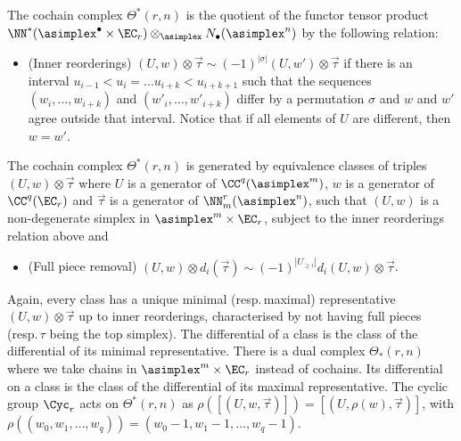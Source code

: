 \begin{definition} The cochain complex $\Theta^*(r,n)$ is the quotient of the functor tensor product $\NN^*(\asimplex^\bullet\times \EC_r)\otimes_{\asimplex}
N_\bullet(\asimplex^n)$
by the following relation:
\begin{itemize}
    	\item (Inner reorderings) $(U,w)\otimes \vec{\tau}\sim (-1)^{|\sigma|}(U,w')\otimes \vec{\tau}$ if there is an interval $u_{i-1}<u_i =\ldots u_{i+k}<u_{i+k+1}$ such that the sequences $(w_i,\ldots,w_{i+k})$ and $(w'_i,\ldots,w'_{i+k})$ differ by a permutation $\sigma$ and $w$ and $w'$ agree outside that interval. Notice that if all elements of $U$ are different, then $w=w'$.
\end{itemize}
\end{definition}
 The cochain complex $\Theta^*(r,n)$ is generated by equivalence classes of triples $(U,w)\otimes \vec{\tau}$ where $U$ is a generator of $\CC^q(\asimplex^m)$, $w$ is a generator of $\CC^q(\EC_r)$ and $\vec{\tau}$ is a generator of $\NN_m^r(\asimplex^n)$, such that $(U,w)$ is a non-degenerate simplex in $\asimplex^m\times \EC_r$,
subject to the inner reorderings relation above and 
\begin{itemize}
	\item (Full piece removal) $(U,w)\otimes d_i(\vec{\tau})\sim (-1)^{|U_{\ge i}|}d_i(U,w)\otimes \vec{\tau}$.
\end{itemize}
Again, every class has a unique minimal (resp.\,maximal) representative $(U,w)\otimes \vec{\tau}$ up to inner reorderings, characterised by not having full pieces (resp.\,$\tau$ being the top simplex). The differential of a class is the class of the differential of its minimal representative. There is a dual complex $\Theta_*(r,n)$ where we take chains in $\asimplex^m\times \EC_r$ instead of cochains. Its differential on a class is the class of the differential of its maximal representative. The cyclic group $\Cyc_r$ acts on $\Theta^*(r,n)$ as $\rho([(U,w,\vec{\tau})]) = [(U,\rho(w),\vec{\tau})]$, with $\rho((w_0,w_1,\ldots,w_q)) = (w_0-1,w_1-1,\ldots,w_q-1)$.



